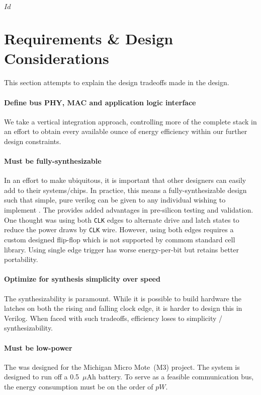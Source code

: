 \svnInfo $Id$

\section{Requirements \& Design Considerations}
\label{sec:requirements}
\label{sec:design}
This section attempts to explain the design tradeoffs made in the \bus design.

\paragraph{Define bus PHY, MAC and application logic interface}
We take a vertical integration approach, controlling more of the complete
stack in an effort to obtain every available ounce of energy efficiency within
our further design constraints.

\paragraph{Must be fully-synthesizable}
In an effort to make \bus ubiquitous, it is important that other designers can
easily add \bus to their systems/chips. In practice, this means a
fully-synthesizable design such that simple, pure verilog can be given to any
individual wishing to implement \bus. The provides added advantages in
pre-silicon testing and validation. One thought was using both {\tt CLK} edges
to alternate {\sc drive} and {\sc latch} states to reduce the power draws by
{\tt CLK} wire. However, using both edges requires a custom designed flip-flop
which is not supported by commom standard cell library. Using single edge 
trigger has worse energy-per-bit but retains better portability.

\paragraph{Optimize for synthesis simplicity over speed}
The synthesizability is paramount. While it is possible to build hardware the
latches on both the rising and falling clock edge, it is harder to design this
in Verilog. When faced with such tradeoffs, efficiency loses to simplicity /
synthesizability.

\paragraph{Must be low-power}
The \bus was designed for the Michigan Micro Mote~(M3) project. The system is
designed to run off a 0.5~$\mu$Ah battery. To serve as a feasible
communication bus, the energy consumption must be on the order of $pW$.

